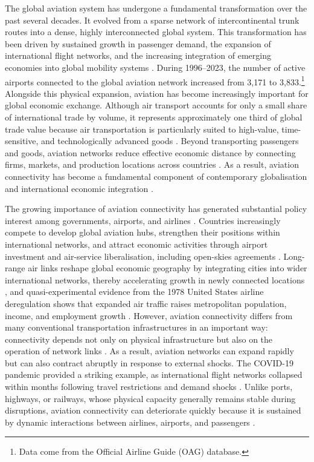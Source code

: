 The global aviation system has undergone a fundamental transformation over
the past several decades. It evolved from a sparse network of
intercontinental trunk routes into a dense, highly interconnected global
system. This transformation has been driven by sustained growth in passenger
demand, the expansion of international flight networks, and the increasing
integration of emerging economies into global mobility systems
\citep{Liao_2026,OKelly_2026}. During 1996--2023, the number of active
airports connected to the global aviation network increased from 3{,}171 to
3{,}833.\footnote{Data come from the Official Airline Guide (OAG) database.}
Alongside this physical expansion, aviation has become increasingly important
for global economic exchange. Although air transport accounts for only a
small share of international trade by volume, it represents approximately one
third of global trade value because air transportation is particularly suited
to high-value, time-sensitive, and technologically advanced goods
\citep{IATA_cargo}. Beyond transporting passengers and goods, aviation
networks reduce effective economic distance by connecting firms, markets, and
production locations across countries \citep{Lenaerts_2021}. As a result,
aviation connectivity has become a fundamental component of contemporary
globalisation and international economic integration \citep{Zhang_2026}.

The growing importance of aviation connectivity has generated substantial
policy interest among governments, airports, and airlines \citep{Adler_2014}.
Countries increasingly compete to develop global aviation hubs, strengthen
their positions within international networks, and attract economic
activities through airport investment and air-service liberalisation,
including open-skies agreements \citep{Gillen_2002,Burghouwt_2015}.
Long-range air links reshape global economic geography by integrating cities
into wider international networks, thereby accelerating growth in newly
connected locations \citep{Campante_2017}, and quasi-experimental evidence
from the 1978 United States airline deregulation shows that expanded air
traffic raises metropolitan population, income, and employment growth
\citep{Blonigen_2015}. However, aviation connectivity
differs from many conventional transportation infrastructures in an important
way: connectivity depends not only on physical infrastructure but also on the
operation of network links \citep{Wandelt_2025}. As a result, aviation
networks can expand rapidly but can also contract abruptly in response to
external shocks. The COVID-19 pandemic provided a striking example, as
international flight networks collapsed within months following travel
restrictions and demand shocks \citep{Sun_2021}. Unlike ports, highways, or
railways, whose physical capacity generally remains stable during
disruptions, aviation connectivity can deteriorate quickly because it is
sustained by dynamic interactions between airlines, airports, and passengers
\citep{Zhou_2021}.

